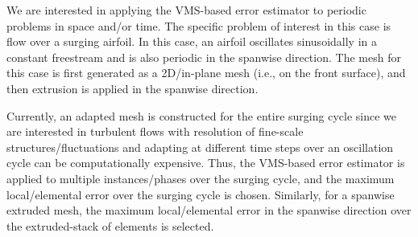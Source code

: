 We are interested in applying the VMS-based error estimator to periodic problems in space and/or time. The specific problem of interest in this case is flow over a surging airfoil. In this case, an airfoil oscillates sinusoidally in a constant freestream and is also periodic in the spanwise direction. The mesh for this case is first generated as a 2D/in-plane mesh (i.e., on the front surface), and then extrusion is applied in the spanwise direction.

Currently, an adapted mesh is constructed for the entire surging cycle since we are interested in turbulent flows with resolution of fine-scale structures/fluctuations and adapting at different time steps over an oscillation cycle can be computationally expensive. Thus, the VMS-based error estimator is applied to multiple instances/phases over the surging cycle, and the maximum local/elemental error over the surging cycle is chosen. Similarly, for a spanwise extruded mesh, the maximum local/elemental error in the spanwise direction over the extruded-stack of elements is selected.
